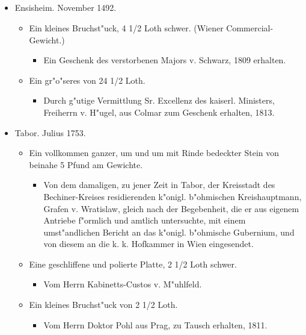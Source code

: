 \documentclass[a4paper, 11pt, oneside, polutonikogreek, german]{article}
\begin{document}
\subsection{}
\begin{itemize}
    \item Ensisheim. November 1492.
    \begin{itemize}
        \item Ein kleines Bruchst"uck, 4 1/2 Loth schwer. (Wiener Commercial-Gewicht.)
        \begin{itemize}
            \item Ein Geschenk des verstorbenen Majors v. Schwarz, 1809 erhalten.
        \end{itemize}
        \item Ein gr"o"seres von 24 1/2 Loth.
        \begin{itemize}
            \item Durch g"utige Vermittlung Sr. Excellenz des kaiserl. Ministers, Freiherrn v. H"ugel, aus Colmar zum Geschenk erhalten, 1813.
        \end{itemize}
    \end{itemize}
    \item Tabor. Julius 1753.
    \begin{itemize}
        \item Ein vollkommen ganzer, um und um mit Rinde bedeckter Stein von beinahe 5 Pfund am Gewichte.
        \begin{itemize}
            \item Von dem damaligen, zu jener Zeit in Tabor, der Kreisstadt des Bechiner-Kreises residierenden k"onigl. b"ohmischen Kreishauptmann, Grafen v. Wratislaw, gleich nach der Begebenheit, die er aus eigenem Antriebe f"ormlich und amtlich untersuchte, mit einem umst"andlichen Bericht an das k"onigl. b"ohmische Gubernium, und von diesem an die k. k. Hofkammer in Wien eingesendet.
        \end{itemize}
        \item Eine geschliffene und polierte Platte, 2 1/2 Loth schwer.
        \begin{itemize}
            \item Vom Herrn Kabinetts-Custos v. M"uhlfeld.
        \end{itemize}
        \item Ein kleines Bruchst"uck von 2 1/2 Loth.
        \begin{itemize}
            \item Vom Herrn Doktor Pohl aus Prag, zu Tausch erhalten, 1811.

\end{itemize}
\end{itemize}
\end{itemize}
\end{document}
